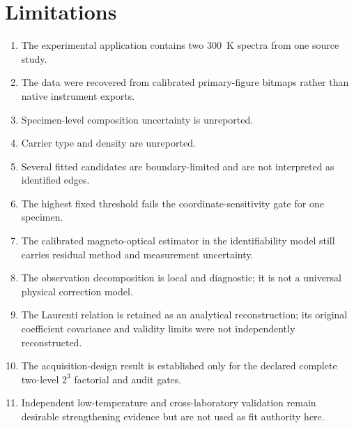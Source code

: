 \section{Limitations}
\label{sec:limitations}

\begin{enumerate}
  \item The experimental application contains two 300~K spectra from one source study.
  \item The data were recovered from calibrated primary-figure bitmaps rather than native instrument exports.
  \item Specimen-level composition uncertainty is unreported.
  \item Carrier type and density are unreported.
  \item Several fitted candidates are boundary-limited and are not interpreted as identified edges.
  \item The highest fixed threshold fails the coordinate-sensitivity gate for one specimen.
  \item The calibrated magneto-optical estimator in the identifiability model still carries residual method and measurement uncertainty.
  \item The observation decomposition is local and diagnostic; it is not a universal physical correction model.
  \item The Laurenti relation is retained as an analytical reconstruction; its original coefficient covariance and validity limits were not independently reconstructed.
  \item The acquisition-design result is established only for the declared complete two-level $2^3$ factorial and audit gates.
  \item Independent low-temperature and cross-laboratory validation remain desirable strengthening evidence but are not used as fit authority here.
\end{enumerate}